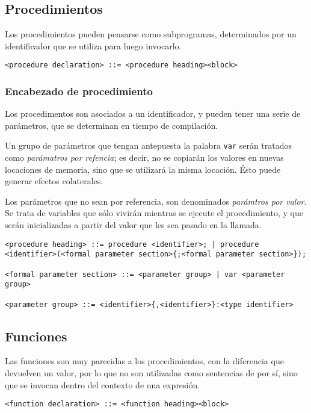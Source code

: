 \documentclass[a4paper,oneside]{report}
\begin{document}
\subsection{Procedimientos}

Los procedimientos pueden pensarse como subprogramas, determinados por un identificador que se utiliza para luego invocarlo.

\begin{verbatim}
<procedure declaration> ::= <procedure heading><block>
\end{verbatim}

\subsubsection{Encabezado de procedimiento}

Los procedimentos son asociados a un identificador, y pueden tener una serie de parámetros, que se determinan en tiempo de compilación.

Un grupo de parámetros que tengan antepuesta la palabra \texttt{var} serán tratados como \textit{parámatros por refencia}; es decir, no se copiarán los valores en nuevas locaciones de memoria, sino que se utilizará la misma locación. Ésto puede generar efectos colaterales.

Los parámetros que no sean por referencia, son denominados \textit{parámtros por valor}. Se trata de variables que sólo vivirán mientras se ejecute el procedimiento, y que serán inicializadas a partir del valor que les sea pasado en la llamada.

\begin{verbatim}
<procedure heading> ::= procedure <identifier>; | procedure <identifier>(<formal parameter section>{;<formal parameter section>});

<formal parameter section> ::= <parameter group> | var <parameter group>

<parameter group> ::= <identifier>{,<identifier>}:<type identifier>
\end{verbatim}
\subsection{Funciones}

Las funciones son muy parecidas a los procedimientos, con la diferencia que devuelven un valor, por lo que no son utilizadas como sentencias de por sí, sino que se invocan dentro del contexto de una expresión.

\begin{verbatim}
<function declaration> ::= <function heading><block>
\end{verbatim}
\end{document}
